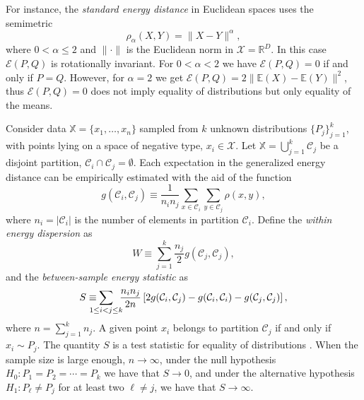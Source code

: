 \documentclass[twoside]{article}
\newcommand\Energy{\mathcal{E}}
\newcommand\E{\mathbb{E}}
\newcommand\C{{\mathcal{C}}}
\begin{document}
For instance, the \emph{standard
energy distance} \citep{Szkely2013} in Euclidean spaces uses
the semimetric
\begin{equation}
\label{eq:rho_standard}
\rho_\alpha(X,Y) = \| X - Y\|^\alpha,
\end{equation} 
where $0< \alpha \le 2$ and $\| \cdot \|$ is the
Euclidean norm in $\mathcal{X}=\mathbb{R}^D$. In this case $\Energy(P,Q)$
is rotationally invariant. For $0<\alpha<2$ we have
$\Energy(P,Q) = 0$ if and only if $P=Q$. However, for $\alpha=2$
we get $\Energy(P,Q) = 2\| \E(X) - \E(Y) \|^2$, thus
$\Energy(P,Q)=0$ does 
not imply equality of distributions but only equality
of the means.
 
Consider data $\mathbb{X} = \{ x_1,\dotsc, x_n \}$ 
sampled from $k$ unknown distributions $\{ P_j \}_{j=1}^k$,
with points lying on a space of negative type,
$x_i \in \mathcal{X}$.
Let $\mathbb{X} = \bigcup_{j=1}^k \C_j$ be a disjoint
partition, $\C_i \cap \C_j = \emptyset$.
Each expectation in the generalized energy distance
can be empirically estimated with the aid of the
function
\begin{equation}
\label{eq:g_def}
g (\C_i, \C_j) \equiv 
\dfrac{1}{n_i n_j}
\sum_{x \in \C_i} 
\sum_{y \in \C_j} \rho(x, y) ,
\end{equation}
where $n_i = |\C_i|$ is the number of elements in partition
$\C_i$. 
Define the \emph{within energy dispersion} as
\begin{equation}
\label{eq:within}
W \equiv
\sum_{j=1}^{k} \dfrac{n_j}{2} g(\C_j, \C_j),
\end{equation}
and the \emph{between-sample energy statistic} as
\begin{equation}
\label{eq:between}
S \equiv \hspace{-1em}
\sum_{1 \le  i < j \le k } \hspace{-.5em} \dfrac{n_i n_{j}}{2 n} \left[
2 g(\C_i, \C_j) - 
g(\C_i, \C_i) - 
g(\C_j, \C_j)
\right],
\end{equation}
where $n = \sum_{j=1}^k n_j$.
A given point $x_i$ belongs to partition $\C_j$
if and only if $x_i \sim P_j$. 
The quantity $S$ is
a test statistic for equality of distributions
\citep{Szkely2013}.
When the sample size is large enough, $n\to \infty$,
under the null hypothesis $H_0: P_1=P_2=\dotsm=P_k$ we have that
$S\to 0$, 
and under
the alternative hypothesis $H_1: P_\ell \ne P_j$ for at least two $\ell\ne j$, 
we have that $S \to \infty$.
\end{document}
